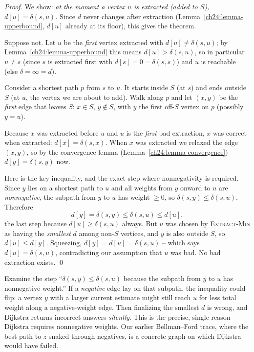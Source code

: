 \begin{formalbox}
\emph{Proof.} We show: \emph{at the moment a vertex $u$ is extracted (added to
$S$), $d[u]=\delta(s,u)$.} Since $d$ never changes after extraction
(Lemma~\ref{ch24:lemma-upperbound}, $d[u]$ already at its floor), this gives the
theorem.

Suppose not. Let $u$ be the \emph{first} vertex extracted with
$d[u]\ne\delta(s,u)$; by Lemma~\ref{ch24:lemma-upperbound} this means
$d[u]>\delta(s,u)$, so in particular $u\ne s$ (since $s$ is extracted first with
$d[s]=0=\delta(s,s)$) and $u$ is reachable (else $\delta=\infty=d$).

Consider a shortest path $p$ from $s$ to $u$. It starts inside $S$ (at $s$) and
ends outside $S$ (at $u$, the vertex we are about to add). Walk along $p$ and let
$(x,y)$ be the \emph{first} edge that leaves $S$: $x\in S$, $y\notin S$, with $y$
the first off-$S$ vertex on $p$ (possibly $y=u$).

\smallskip
Because $x$ was extracted before $u$ and $u$ is the \emph{first} bad extraction,
$x$ was correct when extracted: $d[x]=\delta(s,x)$. When $x$ was extracted we
relaxed the edge $(x,y)$, so by the convergence lemma
(Lemma~\ref{ch24:lemma-convergence}) $d[y]=\delta(s,y)$ now.

\smallskip
Here is the key inequality, and the exact step where nonnegativity is required. Since $y$ lies on a
shortest path to $u$ and all weights from $y$ onward to $u$ are
\emph{nonnegative}, the subpath from $y$ to $u$ has weight $\ge 0$, so
$\delta(s,y) \le \delta(s,u)$. Therefore
\[
d[y] = \delta(s,y) \le \delta(s,u) \le d[u],
\]
the last step because $d[u]\ge\delta(s,u)$ always. But $u$ was chosen by
\textsc{Extract-Min} as having the \emph{smallest} $d$ among non-$S$ vertices, and
$y$ is also outside $S$, so $d[u]\le d[y]$. Squeezing, $d[y]=d[u]=\delta(s,u)$ --
which says $d[u]=\delta(s,u)$, contradicting our assumption that $u$ was bad. No
bad extraction exists. \qed
\end{formalbox}

\begin{trapbox}
Examine the step ``$\delta(s,y)\le\delta(s,u)$ because the subpath from $y$ to
$u$ has nonnegative weight.'' If a \emph{negative} edge lay on that subpath, the
inequality could flip: a vertex $y$ with a larger current estimate might still
reach $u$ for less total weight along a negative-weight edge. Then finalizing the smallest
$d$ is wrong, and Dijkstra returns incorrect answers \emph{silently}. This is the
precise, single reason Dijkstra requires nonnegative weights. Our earlier
Bellman--Ford trace, where the best path to $z$ snaked through negatives, is a
concrete graph on which Dijkstra would have failed.
\end{trapbox}

